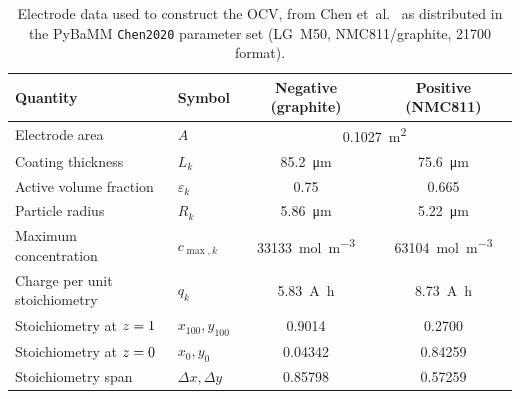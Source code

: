 \begin{table}[H]\centering
\caption{Electrode data used to construct the OCV, from Chen et~al.~\cite{chen2020parameterization}
as distributed in the PyBaMM \texttt{Chen2020} parameter set (LG~M50, NMC811/graphite,
21700 format).}
\label{tab:ecm-chen}
\begin{tabular}{llcc}\toprule
Quantity & Symbol & Negative (graphite) & Positive (NMC811) \\ \midrule
Electrode area & $A$ & \multicolumn{2}{c}{\SI{0.1027}{\square\metre}} \\
Coating thickness & $L_k$ & \SI{85.2}{\micro\metre} & \SI{75.6}{\micro\metre}\\
Active volume fraction & $\varepsilon_k$ & \num{0.75} & \num{0.665}\\
Particle radius & $R_k$ & \SI{5.86}{\micro\metre} & \SI{5.22}{\micro\metre}\\
Maximum concentration & $c_{\max,k}$ & \SI{33133}{\mole\per\cubic\metre} & \SI{63104}{\mole\per\cubic\metre}\\
Charge per unit stoichiometry & $q_k$ & \SI{5.83}{\ampere\hour} & \SI{8.73}{\ampere\hour}\\
Stoichiometry at $z=1$ & $x_{100}, y_{100}$ & \num{0.9014} & \num{0.2700}\\
Stoichiometry at $z=0$ & $x_{0}, y_{0}$ & \num{0.04342} & \num{0.84259}\\
Stoichiometry span & $\Delta x, \Delta y$ & \num{0.85798} & \num{0.57259}\\
\bottomrule\end{tabular}
\end{table}

